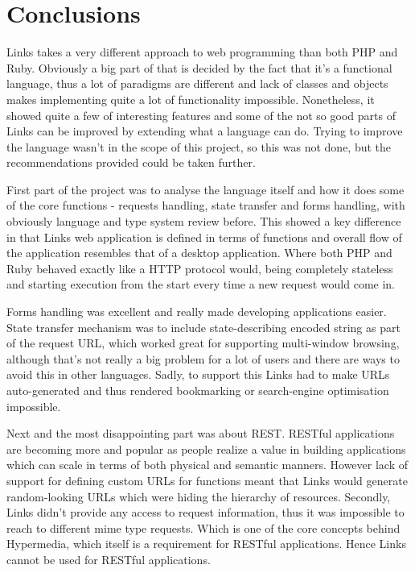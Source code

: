 \chapter{Conclusions}

Links takes a very different approach to web programming than both PHP and Ruby. Obviously a big part of that is decided by the fact that it's a functional language, thus a lot of paradigms are different and lack of classes and objects makes implementing quite a lot of functionality impossible. Nonetheless, it showed quite a few of interesting features and some of the not so good parts of Links can be improved by extending what a language can do. Trying to improve the language wasn't in the scope of this project, so this was not done, but the recommendations provided could be taken further.

First part of the project was to analyse the language itself and how it does some of the core functions - requests handling, state transfer and forms handling, with obviously language and type system review before. This showed a key difference in that Links web application is defined in terms of functions and overall flow of the application resembles that of a desktop application. Where both PHP and Ruby behaved exactly like a HTTP protocol would, being completely stateless and starting execution from the start every time a new request would come in.

Forms handling was excellent and really made developing applications easier. State transfer mechanism was to include state-describing encoded string as part of the request URL, which worked great for supporting multi-window browsing, although that's not really a big problem for a lot of users and there are ways to avoid this in other languages. Sadly, to support this Links had to make URLs auto-generated and thus rendered bookmarking or search-engine optimisation impossible.

Next and the most disappointing part was about REST. RESTful applications are becoming more and popular as people realize a value in building applications which can scale in terms of both physical and semantic manners. However lack of support for defining custom URLs for functions meant that Links would generate random-looking URLs which were hiding the hierarchy of resources. Secondly, Links didn't provide any access to request information, thus it was impossible to reach to different mime type requests. Which is one of the core concepts behind Hypermedia, which itself is a requirement for RESTful applications. Hence Links cannot be used for RESTful applications.

